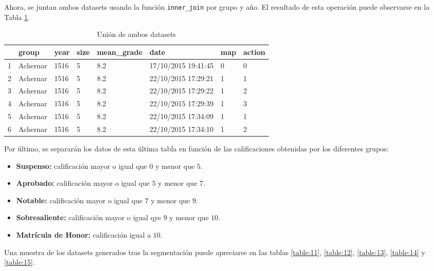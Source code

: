 \documentclass[10pt,a4paper]{article}
\begin{document}
Ahora, se juntan ambos datasets usando la función \texttt{inner\_join} por grupo y año. El resultado de esta operación puede observarse en la Tabla \ref{table:10}.

\begin{table}[ht]
\centering
\begin{tabular}{rlllllll}
  \hline
 & group & year & size & mean\_grade & date & map & action \\ 
  \hline
1 & Achernar & 1516 & 5 & 8.2 & 17/10/2015 19:41:45 & 0 & 0 \\ 
  2 & Achernar & 1516 & 5 & 8.2 & 22/10/2015 17:29:21 & 1 & 1 \\ 
  3 & Achernar & 1516 & 5 & 8.2 & 22/10/2015 17:29:22 & 1 & 2 \\ 
  4 & Achernar & 1516 & 5 & 8.2 & 22/10/2015 17:29:39 & 1 & 3 \\ 
  5 & Achernar & 1516 & 5 & 8.2 & 22/10/2015 17:34:09 & 1 & 1 \\ 
  6 & Achernar & 1516 & 5 & 8.2 & 22/10/2015 17:34:10 & 1 & 2 \\ 
   \hline
\end{tabular}
\caption{Unión de ambos datasets}
\label{table:10}
\end{table}

Por último, se separarán los datos de esta última tabla en función de las calificaciones obtenidas por los diferentes grupos:
\begin{itemize}
	\item \textbf{Suspenso:} calificación mayor o igual que $0$ y menor que $5$.
	\item \textbf{Aprobado:} calificación mayor o igual que $5$ y menor que $7$.
	\item \textbf{Notable:} calificación mayor o igual que $7$ y menor que $9$.
	\item \textbf{Sobresaliente:} calificación mayor o igual qye $9$ y menor que $10$.
	\item \textbf{Matrícula de Honor:} calificación igual a $10$.
\end{itemize}

Una muestra de los datasets generados tras la segmentación puede apreciarse en las tablas \ref{table:11}, \ref{table:12}, \ref{table:13}, \ref{table:14} y \ref{table:15}.
\end{document}
